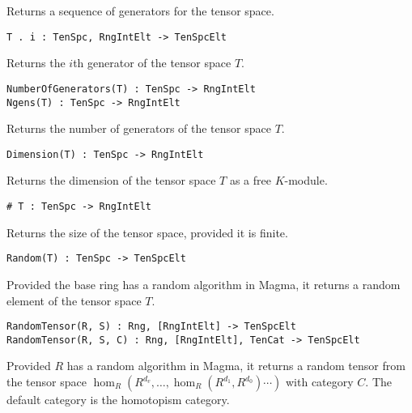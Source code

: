Returns a sequence of generators for the tensor space. 

\color{blue}
{\small \begin{verbatim}
T . i : TenSpc, RngIntElt -> TenSpcElt
\end{verbatim} }
\color{black}

Returns the $i$th generator of the tensor space $T$.

\color{blue}
{\small \begin{verbatim}
NumberOfGenerators(T) : TenSpc -> RngIntElt
Ngens(T) : TenSpc -> RngIntElt
\end{verbatim} }
\color{black}

Returns the number of generators of the tensor space $T$.

\color{blue}
{\small \begin{verbatim}
Dimension(T) : TenSpc -> RngIntElt
\end{verbatim} }
\color{black}

Returns the dimension of the tensor space $T$ as a free $K$-module.

\color{blue}
\index{\#}
{\small \begin{verbatim}
# T : TenSpc -> RngIntElt
\end{verbatim} }
\color{black}

Returns the size of the tensor space, provided it is finite.

\color{blue}
{\small \begin{verbatim}
Random(T) : TenSpc -> TenSpcElt
\end{verbatim} }
\color{black}

Provided the base ring has a random algorithm in Magma, it returns a random 
element of the tensor space $T$.

\color{blue}
{\small \begin{verbatim}
RandomTensor(R, S) : Rng, [RngIntElt] -> TenSpcElt
RandomTensor(R, S, C) : Rng, [RngIntElt], TenCat -> TenSpcElt
\end{verbatim} }
\color{black}

Provided $R$ has a random algorithm in Magma, it returns a random tensor from 
the tensor space $\hom_R(R^{d_v},\dots,\hom_R(R^{d_1},R^{d_0})\cdots )$ with category $C$.
The default category is the homotopism category.


